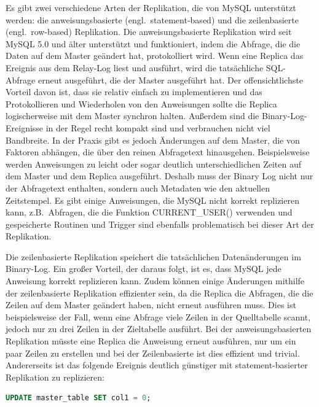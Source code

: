 Es gibt zwei verschiedene Arten der Replikation, die von MySQL unterstützt werden: die anweisungsbasierte (engl.\ statement-based) und die zeilenbasierte (engl.\ row-based) Replikation.
Die anweisungsbasierte Replikation wird seit MySQL 5.0 und älter unterstützt und funktioniert, indem die Abfrage, die die Daten auf dem Master geändert hat, protokolliert wird.
Wenn eine Replica das Ereignis aus dem Relay-Log liest und ausführt, wird die tatsächliche SQL-Abfrage erneut ausgeführt, die der Master ausgeführt hat.
Der offensichtlichste Vorteil davon ist, dass sie relativ einfach zu implementieren und das Protokollieren und Wiederholen von den Anweisungen sollte die Replica logischerweise mit dem Master synchron halten.
Außerdem sind die Binary-Log-Ereignisse in der Regel recht kompakt sind und verbrauchen nicht viel Bandbreite.
In der Praxis gibt es jedoch Änderungen auf dem Master, die von Faktoren abhängen, die über den reinen Abfragetext hinausgehen.
Beispielsweise werden Anweisungen zu leicht oder sogar deutlich unterschiedlichen Zeiten auf dem Master und dem Replica ausgeführt.
Deshalb muss der Binary Log nicht nur der Abfragetext enthalten, sondern auch Metadaten wie den aktuellen Zeitstempel.
Es gibt einige Anweisungen, die MySQL nicht korrekt replizieren kann, z.B.\ Abfragen, die die Funktion CURRENT\_USER() verwenden und gespeicherte Routinen und Trigger sind ebenfalls problematisch bei dieser Art der Replikation.

Die zeilenbasierte Replikation speichert die tatsächlichen Datenänderungen im Binary-Log.
Ein großer Vorteil, der daraus folgt, ist es, dass MySQL jede Anweisung korrekt replizieren kann.
Zudem können einige Änderungen mithilfe der zeilenbasierte Replikation effizienter sein, da die Replica die Abfragen, die die Zeilen auf dem Master geändert haben, nicht erneut ausführen muss.
Dies ist beispielsweise der Fall, wenn eine Abfrage viele Zeilen in der Quelltabelle scannt, jedoch nur zu drei Zeilen in der Zieltabelle ausführt.
Bei der anweisungsbasierten Replikation müsste eine Replica die Anweisung erneut ausführen, nur um ein paar Zeilen zu erstellen und bei der Zeilenbasierte ist dies effizient und trivial.
Andererseits ist das folgende Ereignis deutlich günstiger mit statement-basierter Replikation zu replizieren:

\vspace{-5pt}
\begin{lstlisting}[language=SQL,caption=Update-Befehl auf dem Master,label={lst:replication-update-command}]
UPDATE master_table SET col1 = 0;
\end{lstlisting}
\vspace{-5pt}

